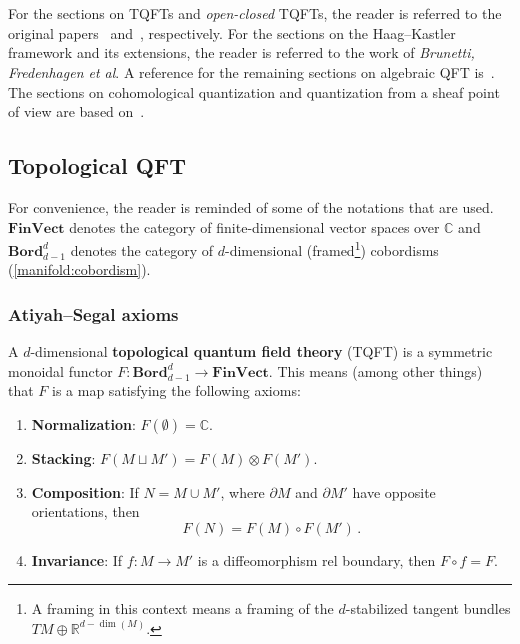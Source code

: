 \chapter{}

    For the sections on TQFTs and \textit{open-closed} TQFTs, the reader is referred to the original papers~\citet{atiyah_topological_1988} and~\citet{lauda_openclosed_2008}, respectively. For the sections on the Haag--Kastler framework and its extensions, the reader is referred to the work of \textit{Brunetti, Fredenhagen et al}. A reference for the remaining sections on algebraic QFT is~\citet{baez_introduction_2014}. The sections on cohomological quantization and quantization from a sheaf point of view are based on~\citet{nuiten_cohomological_2013}.

\section{Topological QFT}

    For convenience, the reader is reminded of some of the notations that are used. $\mathbf{FinVect}$ denotes the category of finite-dimensional vector spaces over $\mathbb{C}$ and $\mathbf{Bord}^d_{d-1}$ denotes the category of $d$-dimensional (framed\footnote{A framing in this context means a framing of the $d$-stabilized tangent bundles $TM\oplus\mathbb{R}^{d-\dim(M)}$.}) cobordisms (\cref{manifold:cobordism}).

\subsection{Atiyah--Segal axioms}

    \begin{axiom}
        A $d$-dimensional \textbf{topological quantum field theory} (TQFT) is a symmetric monoidal functor $F:\mathbf{Bord}_{d-1}^d\rightarrow\mathbf{FinVect}$. This means (among other things) that $F$ is a map satisfying the following axioms:
        \begin{enumerate}
            \item\textbf{Normalization}: $F(\emptyset)=\mathbb{C}$.
            \item\textbf{Stacking}: $F(M\sqcup M') = F(M)\otimes F(M')$.
            \item\textbf{Composition}: If $N=M\cup M'$, where $\partial M$ and $\partial M'$ have opposite orientations, then \[F(N) = F(M)\circ F(M')\,.\]
            \item\textbf{Invariance}: If $f: M\rightarrow M'$ is a diffeomorphism rel boundary, then $F\circ f = F$.
        \end{enumerate}
    \end{axiom}


